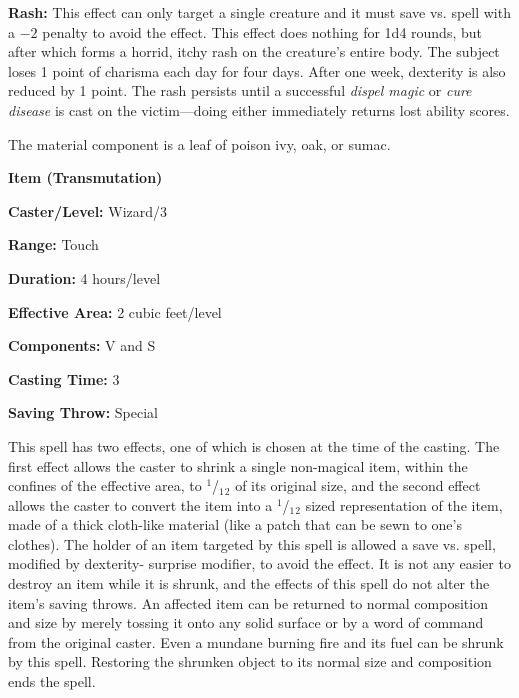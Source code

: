 \begin{multicols}{2}
\textbf{Rash:} This effect can only target a single creature and it must save vs. spell with a $-2$ penalty to avoid the effect.  This effect does nothing for 1d4 rounds, but after which forms a horrid, itchy rash on the creature's entire body.  The subject loses 1 point of charisma each day for four days.  After one week, dexterity is also reduced by 1 point.  The rash persists until a successful \textit{dispel magic} or \textit{cure disease} is cast on the victim---doing either immediately returns lost ability scores.  

The material component is a leaf of poison ivy, oak, or sumac.

\vspace{1em}

\noindent
\begin{minipage}{\columnwidth}

\noindent \textbf{Item (Transmutation)}

\noindent \textbf{Caster/Level:} Wizard/3

\noindent \textbf{Range:} Touch

\noindent \textbf{Duration:} 4 hours/level

\noindent \textbf{Effective Area:} 2 cubic feet/level

\noindent \textbf{Components:} V and S

\noindent \textbf{Casting Time:} 3

\noindent \textbf{Saving Throw:} Special

\end{minipage}

This spell has two effects, one of which is chosen at the time of the casting.  The first effect allows the caster to shrink a single non-magical item, within the confines of the effective area, to $^1$/$_1$$_2$ of its original size, and the second effect allows the caster to convert the item into a $^1$/$_1$$_2$ sized representation of the item, made of a thick cloth-like material (like a patch that can be sewn to one's clothes).  The holder of an item targeted by this spell is allowed a save vs. spell, modified by dexterity- surprise modifier, to avoid the effect.  It is not any easier to destroy an item while it is shrunk, and the effects of this spell do not alter the item's saving throws.  An affected item can be returned to normal composition and size by merely tossing it onto any solid surface or by a word of command from the original caster. Even a mundane burning fire and its fuel can be shrunk by this spell. Restoring the shrunken object to its normal size and composition ends the spell. 


\end{multicols}
